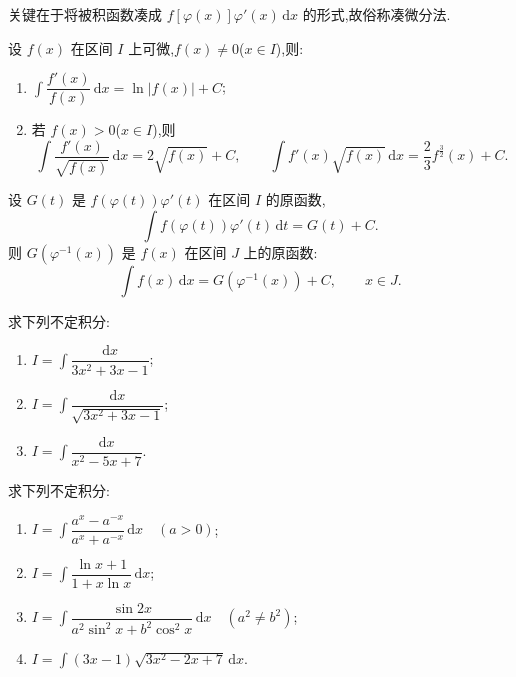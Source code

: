 \documentclass[../数学分析培优讲义.tex]{subfiles}
\begin{document}
\begin{remark}
关键在于将被积函数凑成 $f[\varphi(x)]\varphi'(x)\,\mathrm{d}x$ 的形式,故俗称凑微分法.
\end{remark}

\begin{corollary}[\markstar]
设 $f(x)$ 在区间 $I$ 上可微,$f(x)\neq0$($x\in I$),则:
\begin{enumerate}[label=(\arabic*)]
    \item $\displaystyle\int\dfrac{f'(x)}{f(x)}\,\mathrm{d}x=\ln|f(x)|+C$;
    \item 若 $f(x)>0$($x\in I$),则
    \[
        \int\dfrac{f'(x)}{\sqrt{f(x)}}\,\mathrm{d}x=2\sqrt{f(x)}+C,
        \qquad
        \int f'(x)\sqrt{f(x)}\,\mathrm{d}x
        =\dfrac{2}{3}f^{\frac{3}{2}}(x)+C.
    \]
\end{enumerate}
\end{corollary}

\begin{theorem}[第二积分换元法]
设 $G(t)$ 是 $f(\varphi(t))\varphi'(t)$ 在区间 $I$ 的原函数,
\[
    \int f(\varphi(t))\varphi'(t)\,\mathrm{d}t=G(t)+C.
\]
则 $G(\varphi^{-1}(x))$ 是 $f(x)$ 在区间 $J$ 上的原函数:
\[
    \int f(x)\,\mathrm{d}x=G(\varphi^{-1}(x))+C,
    \qquad x\in J.
\]
\end{theorem}

\begin{example}
求下列不定积分:
\begin{enumerate}[label=(\arabic*)]
    \item $\displaystyle I=\int\dfrac{\mathrm{d}x}{3x^2+3x-1}$;
    \item $\displaystyle I=\int\dfrac{\mathrm{d}x}{\sqrt{3x^2+3x-1}}$;
    \item $\displaystyle I=\int\dfrac{\mathrm{d}x}{x^2-5x+7}$.
\end{enumerate}
\end{example}
\exampleblank

\begin{example}
求下列不定积分:
\begin{enumerate}[label=(\arabic*)]
    \item $\displaystyle I=\int\dfrac{a^x-a^{-x}}{a^x+a^{-x}}\,\mathrm{d}x\quad(a>0)$;
    \item $\displaystyle I=\int\dfrac{\ln x+1}{1+x\ln x}\,\mathrm{d}x$;
    \item $\displaystyle I=\int\dfrac{\sin2x}{a^2\sin^2x+b^2\cos^2x}\,\mathrm{d}x\quad(a^2\neq b^2)$;
    \item $\displaystyle I=\int(3x-1)\sqrt{3x^2-2x+7}\,\mathrm{d}x$.
\end{enumerate}
\end{example}
\exampleblank
\end{document}
